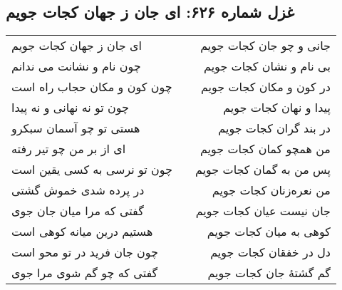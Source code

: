 \begin{center}
\section*{غزل شماره ۶۲۶: ای جان ز جهان کجات جویم}
\label{sec:626}
\begin{longtable}{l p{0.5cm} r}
ای جان ز جهان کجات جویم
&&
جانی و چو جان کجات جویم
\\
چون نام و نشانت می ندانم
&&
بی نام و نشان کجات جویم
\\
چون کون و مکان حجاب راه است
&&
در کون و مکان کجات جویم
\\
چون تو نه نهانی و نه پیدا
&&
پیدا و نهان کجات جویم
\\
هستی تو چو آسمان سبکرو
&&
در بند گران کجات جویم
\\
ای از بر من چو تیر رفته
&&
من همچو کمان کجات جویم
\\
چون تو نرسی به کسی یقین است
&&
پس من به گمان کجات جویم
\\
در پرده شدی خموش گشتی
&&
من نعره‌زنان کجات جویم
\\
گفتی که مرا میان جان جوی
&&
جان نیست عیان کجات جویم
\\
هستیم درین میانه کوهی است
&&
کوهی به میان کجات جویم
\\
چون جان فرید در تو محو است
&&
دل در خفقان کجات جویم
\\
گفتی که چو گم شوی مرا جوی
&&
گم گشتهٔ جان کجات جویم
\\
\end{longtable}
\end{center}
